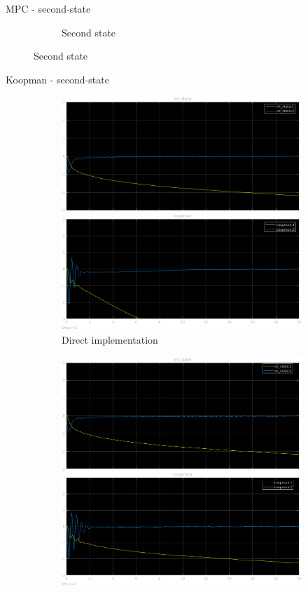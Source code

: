 \documentclass{beamer}
\begin{document}
\begin{frame}{MPC - second-state}
\begin{figure}
\begin{subfigure}[b]{0.45\textwidth}
            \caption{Second state}
        \end{subfigure}
    \end{figure}
\end{frame}

\begin{frame}{Koopman - second-state}
    \begin{figure}
        \centering
        \begin{subfigure}[b]{0.45\textwidth}
            \centering
            \includegraphics[width=\textwidth]{second_koopman_direct.png}
            \caption{Direct implementation}
        \end{subfigure}
        \hfill
        \begin{subfigure}[b]{0.45\textwidth}
            \centering
            \includegraphics[width=\textwidth]{second_koopman_differential.png}

\end{subfigure}
\end{figure}
\end{frame}
\end{document}
